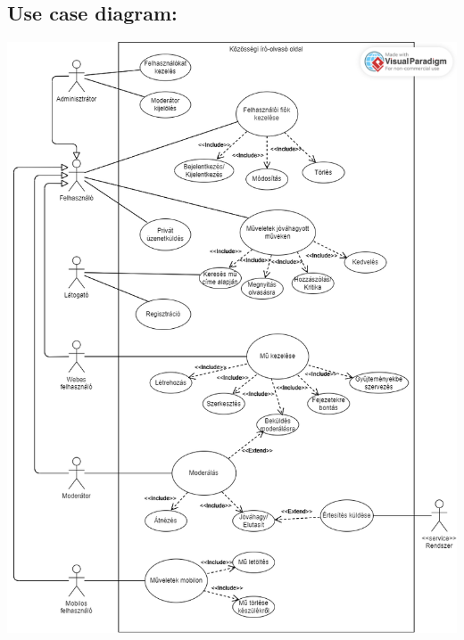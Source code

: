 \subsection{Use case diagram:}
\begin{center}
    \includegraphics[width=\textwidth,height=\textheight,keepaspectratio]{./figures/Use-case_diagram.png}
\end{center}